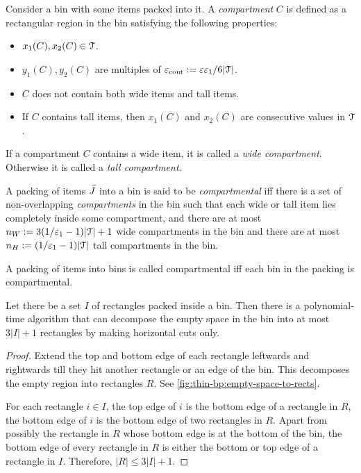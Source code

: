\begin{definition}
\label{defn:thin-bp:compartmental}
Consider a bin with some items packed into it. A \emph{compartment} $C$
is defined as a rectangular region in the bin satisfying the following properties:
\begin{itemize}
\item $x_1(C), x_2(C) \in \mathcal{T}$.
\item $y_1(C), y_2(C)$ are multiples of $\varepsilon_{\mathrm{cont}} := \varepsilon\varepsilon_1/6|\mathcal{T}|$.
\item $C$ does not contain both wide items and tall items.
\item If $C$ contains tall items, then $x_1(C)$ and $x_2(C)$
    are consecutive values in $\mathcal{T}$.
\end{itemize}
If a compartment $C$ contains a wide item, it is called a \emph{wide compartment}.
Otherwise it is called a \emph{tall compartment}.

A packing of items $\widetilde{J}$ into a bin is said to be \emph{compartmental}
iff there is a set of non-overlapping \emph{compartments} in the bin
such that each wide or tall item lies completely inside some compartment,
and there are at most $n_W := 3(1/\varepsilon_1-1)|\mathcal{T}| + 1$ wide compartments in the bin
and there are at most $n_H := (1/\varepsilon_1-1)|\mathcal{T}|$ tall compartments in the bin.

A packing of items into bins is called compartmental iff
each bin in the packing is compartmental.
\end{definition}

\begin{lemma}
\label{thm:empty-to-rects}
Let there be a set $I$ of rectangles packed inside a bin.
Then there is a polynomial-time algorithm that can decompose the empty space in the bin
into at most $3|I|+1$ rectangles by making horizontal cuts only.
\end{lemma}
\begin{proof}
Extend the top and bottom edge of each rectangle leftwards and rightwards
till they hit another rectangle or an edge of the bin.
This decomposes the empty region into rectangles $R$.
See \cref{fig:thin-bp:empty-space-to-rects}.

For each rectangle $i \in I$, the top edge of $i$ is the bottom edge of a rectangle in $R$,
the bottom edge of $i$ is the bottom edge of two rectangles in $R$.
Apart from possibly the rectangle in $R$ whose bottom edge is at the bottom of the bin,
the bottom edge of every rectangle in $R$ is either the bottom or top edge of a rectangle in $I$.
Therefore, $|R| \le 3|I| + 1$.
\end{proof}


